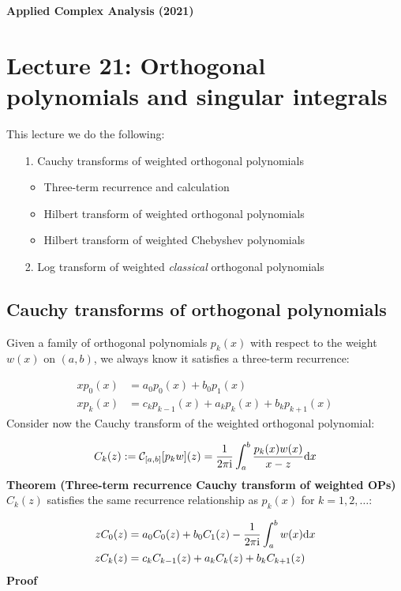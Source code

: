 \documentclass[12pt,a4paper]{article}
\def\D{ {\rm d} }
\def\I{ {\rm i} }
\def\dx{\D x}
\begin{document}
\textbf{Applied Complex Analysis (2021)}

\section{Lecture 21: Orthogonal polynomials and singular integrals}
This lecture we do the following:

\begin{itemize}
\item[1. ] Cauchy transforms of weighted orthogonal polynomials

\begin{itemize}
\item Three-term recurrence and calculation


\item Hilbert transform of weighted orthogonal polynomials


\item Hilbert transform of weighted Chebyshev polynomials

\end{itemize}

\item[2. ] Log transform of weighted \emph{classical} orthogonal polynomials

\end{itemize}
\subsection{Cauchy transforms of orthogonal polynomials}
Given a family of orthogonal polynomials $p_k(x)$ with respect to the weight $w(x)$ on $(a,b)$, we always know it satisfies a three-term recurrence:


\begin{align*}
x p_0(x) &= a_0 p_0(x) + b_0 p_1(x) \\
x p_k(x) &= c_k p_{k-1}(x) + a_k p_k(x) + b_k p_{k+1}(x)
\end{align*}
Consider now the Cauchy transform of the weighted orthogonal polynomial:

\[
C_k(z) := {\cal C}_{[a,b]}[p_k w](z) = {1 \over 2 \pi \I} \int_a^b {p_k(x) w(x) \over x -z} \dx
\]
\textbf{Theorem (Three-term recurrence Cauchy transform of weighted OPs)} $C_k(z)$ satisfies the same recurrence relationship as $p_k(x)$ for $k=1,2,\ldots$:


\begin{align*}
z C_0(z) &= a_0 C_0(z) + b_0 C_1(z) - {1 \over 2 \pi \I} \int_a^b w(x) \dx \\
z C_k(z) &= c_k C_{k-1}(z) + a_k C_k(z) + b_k C_{k+1}(z)
\end{align*}
\textbf{Proof}
\end{document}
